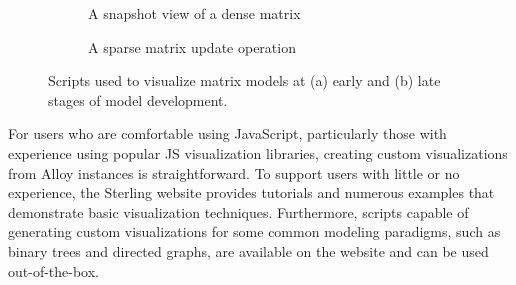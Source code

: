 \documentclass[runningheads]{llncs}
\begin{document}
\begin{figure}[!ht]
    \centering
    \begin{subfigure}{\linewidth}
        \centering
        \caption{A snapshot view of a dense matrix}
        \label{fig:matrix-cyto}
    \end{subfigure}
    \par\bigskip
    \begin{subfigure}{\linewidth}
        \centering
        \caption{A sparse matrix update operation}
        \label{fig:matrix-d3}
    \end{subfigure}
    \caption{Scripts used to visualize matrix models at (a) early and (b) late stages of model development.}
    \label{fig:matrices}
\end{figure}

For users who are comfortable using JavaScript, particularly those with experience using popular JS visualization libraries, creating custom visualizations from Alloy instances is straightforward. 
To support users with little or no experience, the Sterling website provides tutorials and numerous examples that demonstrate basic visualization techniques.
Furthermore, scripts capable of generating custom visualizations for some common modeling paradigms, such as binary trees and directed graphs, are available on the website and can be used out-of-the-box.
\end{document}
